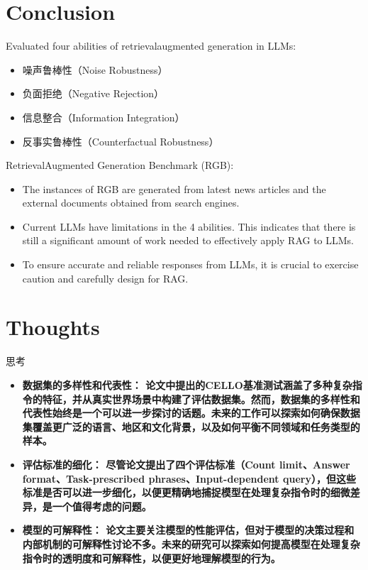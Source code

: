 \documentclass{beamer}
\begin{document}
\begin{frame}
    
\end{frame}

\section{Conclusion}

\begin{frame}
    Evaluated four abilities of retrievalaugmented generation in LLMs:
    \begin{itemize}
        \item {噪声鲁棒性（Noise Robustness）}
        \item {负面拒绝（Negative Rejection）}
        \item {信息整合（Information Integration）}
        \item {反事实鲁棒性（Counterfactual Robustness）}
    \end{itemize}
    RetrievalAugmented Generation Benchmark (RGB):
    \begin{itemize}
        \item {The instances of RGB are generated from latest news articles and the external documents obtained from search engines.}
        \item {Current LLMs have limitations in the 4 abilities. This indicates that there is still a significant amount of work needed to effectively apply RAG to LLMs.}
        \item {To ensure accurate and reliable responses from LLMs, it is crucial to exercise caution and carefully design for RAG.}
    \end{itemize}
\end{frame}

\section{Thoughts}

\begin{frame}{思考}
    \begin{itemize}
        \item {\bfseries{数据集的多样性和代表性：}\normalfont
            论文中提出的CELLO基准测试涵盖了多种复杂指令的特征，并从真实世界场景中构建了评估数据集。然而，数据集的多样性和代表性始终是一个可以进一步探讨的话题。未来的工作可以探索如何确保数据集覆盖更广泛的语言、地区和文化背景，以及如何平衡不同领域和任务类型的样本。}
        \item {\bfseries{评估标准的细化：}\normalfont
            尽管论文提出了四个评估标准（Count limit、Answer format、Task-prescribed phrases、Input-dependent query），但这些标准是否可以进一步细化，以便更精确地捕捉模型在处理复杂指令时的细微差异，是一个值得考虑的问题。}
        \item {\bfseries{模型的可解释性：}\normalfont
            论文主要关注模型的性能评估，但对于模型的决策过程和内部机制的可解释性讨论不多。未来的研究可以探索如何提高模型在处理复杂指令时的透明度和可解释性，以便更好地理解模型的行为。}
    \end{itemize}
\end{frame}
\end{document}
